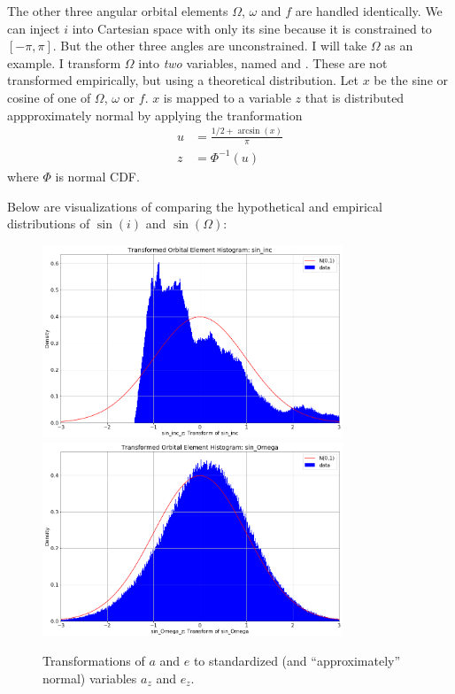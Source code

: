 The other three angular orbital elements $\Omega$, $\omega$ and $f$ are handled identically.
We can inject $i$ into Cartesian space with only its sine because it is constrained to $[-\pi, \pi]$.
But the other three angles are unconstrained.  I will take $\Omega$ as an example.
I transform $\Omega$ into \textit{two} variables, named  and .
These are not transformed empirically, but using a theoretical distribution.
Let $x$ be the sine or cosine of one of $\Omega$, $\omega$ or $f$.
$x$ is mapped to a variable $z$ that is distributed appproximately normal by applying the tranformation
\begin{align*}
u &= \frac{1/2 + \arcsin(x)}{\pi} \\
z &= \Phi^{-1}(u)
\end{align*}
where $\Phi$ is normal CDF.

Below are visualizations of comparing the hypothetical and empirical distributions of $\sin(i)$ and $\sin(\Omega)$:
\begin{figure}[hbt!]
\begin{center}
\includegraphics[width=0.8\textwidth]{../figs/elts_cov/sin_inc_z.png}
\includegraphics[width=0.8\textwidth]{../figs/elts_cov/sin_Omega_z.png}
\caption{Transformations of $a$ and $e$ to standardized (and ``approximately'' normal) variables $a_z$ and $e_z$.}
\end{center}
\end{figure}

